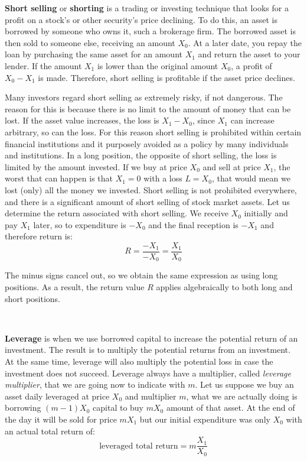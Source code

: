 \textbf{Short selling} or \textbf{shorting} is a trading or investing technique that looks for a profit on a stock's or other security's price declining. 
To do this, an asset is borrowed by someone who owns it, such a brokerage firm. The borrowed asset is then sold to someone else, receiving an amount $X_0$. At a later date, you repay the loan by purchasing the same asset for an amount $X_1$ and return the asset to your lender. If the amount $X_1$ is lower than the original amount $X_0$, a profit of $X_0 - X_1$ is made. Therefore, short selling is profitable if the asset price declines. 
\hfill \break

Many investors regard short selling as extremely risky, if not dangerous.
The reason for this is because there is no limit to the amount of money that can be lost.
If the asset value increases, the loss is $X_1 - X_0$, since $X_1$ can increase arbitrary, so can the loss. For this reason short selling is prohibited within certain financial institutions and it purposely avoided as a policy by many individuals and institutions. In a long position, the opposite of short selling, the loss is limited by the amount invested. If we buy at price $X_0$ and sell at price $X_1$, the worst that can happen is that $X_1=0$ with a loss $L = X_0$, that would mean we lost (only) all the money we invested.
Short selling is not prohibited everywhere, and there is a significant amount of short selling of stock market assets. 
Let us determine the return associated with short selling. We receive $X_0$ initially and pay $X_1$ later, so to expenditure is $-X_0$ and the final reception is $-X_1$ and therefore return is:
$$R = \frac{-X_1}{-X_0} = \frac{X_1}{X_0}$$

The minus signs cancel out, so we obtain the same expression as using long positions. As a result, the return value $R$ applies algebraically to both long and short positions.

\

\textbf{Leverage} is when we use borrowed capital to increase the potential return of an investment. The result is to multiply the potential returns from an investment. At the same time, leverage will also multiply the potential  loss in case the investment does not succeed. 
Leverage always have a multiplier, called \textit{leverage multiplier}, that we are going now to indicate with $m$. Let us suppose we buy an asset daily leveraged at price $X_0$ and multiplier $m$, what we are actually doing is borrowing $(m-1)X_0$ capital to buy $m X_0$ amount of that asset. At the end of the day it will be sold for price $m X_1$ but our initial expenditure was only $X_0$ with an actual total return of:
$$ \text{leveraged total return} = m \frac{X_1}{X_0} $$


